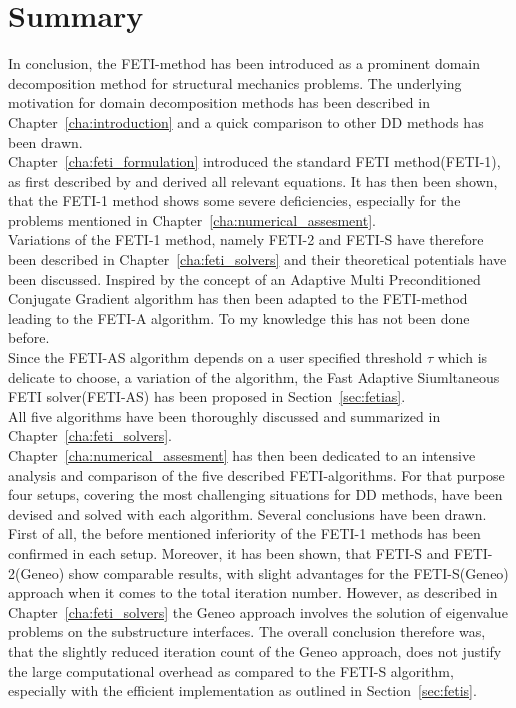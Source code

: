 \chapter{Summary}\label{cha:summary}

In conclusion, the FETI-method has been introduced as a prominent domain decomposition method for structural mechanics problems. The underlying motivation for domain decomposition methods has been described in Chapter~\ref{cha:introduction} and a quick comparison to other DD methods has been drawn.\\
Chapter~\ref{cha:feti_formulation} introduced the standard FETI method(FETI-1), as first described by \cite{Farhat1991} and derived all relevant equations. It has then been shown, that the FETI-1 method shows some severe deficiencies, especially for the problems mentioned in Chapter~\ref{cha:numerical_assesment}.\\
Variations of the FETI-1 method, namely FETI-2 and FETI-S have therefore been described in Chapter~\ref{cha:feti_solvers} and their theoretical potentials have been discussed.
Inspired by\cite{Spillane2016} the concept of an Adaptive Multi Preconditioned Conjugate Gradient algorithm has then been adapted to the FETI-method leading to the FETI-A algorithm. To my knowledge this has not been done before.\\
Since the FETI-AS algorithm depends on a user specified threshold $\tau$ which is delicate to choose, a variation of the algorithm, the Fast Adaptive Siumltaneous FETI solver(FETI-AS) has been proposed in Section~\ref{sec:fetias}.\\
All five algorithms have been thoroughly discussed and summarized in Chapter~\ref{cha:feti_solvers}.\\
Chapter~\ref{cha:numerical_assesment} has then been dedicated to an intensive analysis and comparison of the five described FETI-algorithms. For that purpose four setups, covering the most challenging situations for DD methods, have been devised and solved with each algorithm. Several conclusions have been drawn.\\
First of all, the before mentioned inferiority of the FETI-1 methods has been confirmed in each setup. Moreover, it has been shown, that FETI-S and FETI-2(Geneo) show comparable results, with slight advantages for the FETI-S(Geneo) approach when it comes to the total iteration number. However, as described in Chapter~\ref{cha:feti_solvers} the Geneo approach involves the solution of eigenvalue problems on the substructure interfaces. The overall conclusion therefore was, that the slightly reduced iteration count of the Geneo approach, does not justify the large computational overhead as compared to the FETI-S algorithm, especially with the efficient implementation as outlined in Section~\ref{sec:fetis}.\\
